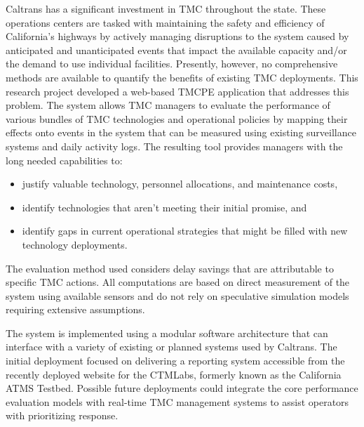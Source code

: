 \documentclass[12pt]{report}
\newcounter{time}
\begin{document}
Caltrans has a significant investment in \ac{TMC} throughout the
state. These operations centers are tasked with maintaining the safety
and efficiency of California's highways by actively managing
disruptions to the system caused by anticipated and unanticipated
events that impact the available capacity and/or the demand to use
individual facilities.  Presently, however, no comprehensive methods
are available to quantify the benefits of existing \ac{TMC}
deployments. This research project developed a web-based \ac{TMCPE}
application that addresses this problem. The system allows \ac{TMC}
managers to evaluate the performance of various bundles of \ac{TMC}
technologies and operational policies by mapping their effects onto
events in the system that can be measured using existing surveillance
systems and daily activity logs. The resulting tool provides managers
with the long needed capabilities to:
\begin{itemize}
\item justify valuable technology, personnel allocations, and
  maintenance costs,
\item identify technologies that aren't meeting their initial promise,
  and
\item identify gaps in current operational strategies that might be
  filled with new technology deployments.
\end{itemize}
The evaluation method used considers delay savings that are
attributable to specific \ac{TMC} actions.  All computations are based
on direct measurement of the system using available sensors and do not
rely on speculative simulation models requiring extensive assumptions.

The system is implemented using a modular software architecture that
can interface with a variety of existing or planned systems used by
Caltrans. The initial deployment focused on delivering a reporting
system accessible from the recently deployed website for the
\ac{CTMLabs}, formerly known as the California \ac{ATMS}
Testbed. Possible future deployments could integrate the core
performance evaluation models with real-time \ac{TMC} management
systems to assist operators with prioritizing response.



\end{document}
